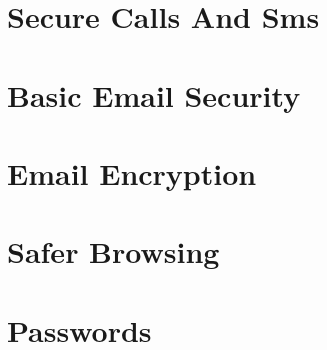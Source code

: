 \documentclass[oribibl]{scrbook}
\begin{document}
\chapter{Secure Calls And Sms}
\clearpage

\clearpage

\graphicspath{{./chapter_05_basic_email_security/}}
\chapter{Basic Email Security}
\clearpage

\clearpage

\clearpage

\graphicspath{{./chapter_06_email_encryption/}}
\chapter{Email Encryption}
\clearpage

\clearpage

\clearpage

\clearpage

\clearpage

\clearpage

\clearpage

\clearpage

\graphicspath{{./chapter_07_safer_browsing/}}
\chapter{Safer Browsing}
\clearpage

\clearpage

\clearpage

\clearpage

\clearpage

\clearpage

\clearpage

\graphicspath{{./chapter_08_passwords/}}
\chapter{Passwords}
\clearpage

\clearpage

\clearpage

\graphicspath{{./chapter_09_using_vpn/}}
\end{document}
